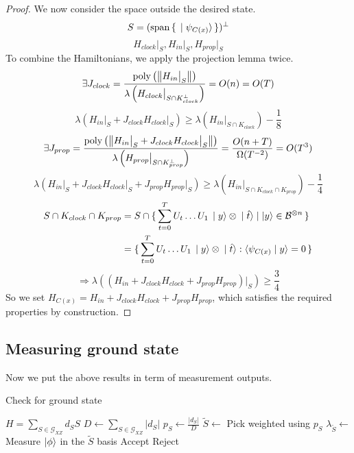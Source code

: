 \begin{proof}
We now consider the space outside the desired state.
$$S=(\operatorname*{\operatorname{span}}\set{\ket{\psi_{C(x)}}})^\bot$$
$$H_{clock}\big|_S,H_{in}\big|_S,H_{prop}\big|_S$$
To combine the Hamiltonians, we apply the projection lemma twice.
$$\exists J_{clock}
=\frac{\operatorname*{\operatorname{poly}}\left(\left\lVert H_{in}\big|_S\right\rVert\right)}{\lambda\left(H_{clock}\big|_{S\cap K^\bot_{clock}}\right)}
=O(n)=O(T)$$
$$\lambda(H_{in}\big|_S+J_{clock}H_{clock}\big|_S)\geq
\lambda(H_{in}\big|_{S\cap K_{clock}})-\frac{1}{8}$$
$$\exists J_{prop}=\frac{\operatorname*{\operatorname{poly}}\left(\left\lVert H_{in}\big|_S+J_{clock}H_{clock}\big|_S\right\rVert\right)}{\lambda\left(H_{prop}\big|_{S\cap K^\bot_{prop}}\right)}
=\frac{O(n+T)}{\Omega(T^{-2})}=O(T^3)$$
$$\lambda(H_{in}\big|_S+J_{clock}H_{clock}\big|_S+J_{prop}H_{prop}\big|_S)\geq
\lambda(H_{in}\big|_{S\cap K_{clock}\cap K_{prop}})-\frac{1}{4}$$
\begin{align*}
	S\cap K_{clock}\cap K_{prop}&=S\cap\set{\sum_{t=0}^TU_t\ldots U_1\ket{y}\otimes\ket{\hat{t}}|\ket{y}\in\mathcal{B}^{\otimes n}}\\
	&=\set{\sum_{t=0}^TU_t\ldots U_1\ket{y}\otimes\ket{\hat{t}}:\braket{\psi_{C(x)}|y}=0}
\end{align*}
$$\Rightarrow\lambda((H_{in}+J_{clock}H_{clock}+J_{prop}H_{prop})\big|_S)\geq\frac{3}{4}$$
So we set $H_{C(x)}=H_{in}+J_{clock}H_{clock}+J_{prop}H_{prop}$, which satisfies the required properties by construction.
\end{proof}

\subsection{Measuring ground state}

Now we put the above results in term of measurement outputs.

\begin{algorithm}
	\caption{Check for ground state}
	\label{AlgGroundStateCheck}
	\begin{algorithmic}[1]
		\Require $H=\sum_{S\in\mathcal{G}_{XZ}} d_S S$
		\State $D\gets\sum_{S\in\mathcal{G}_{XZ}}|d_S|$
		\State $p_S\gets\frac{|d_S|}{D}$
		\State $\widetilde{S}\gets$ Pick weighted using $p_S$
		\State $\lambda_{\widetilde{S}}\gets$ Measure $\ket\phi$ in the $\widetilde{S}$ basis
		\State Accept
		\Else
		\State Reject
		\EndIf
		\EndProcedure
	\end{algorithmic}
\end{algorithm}

